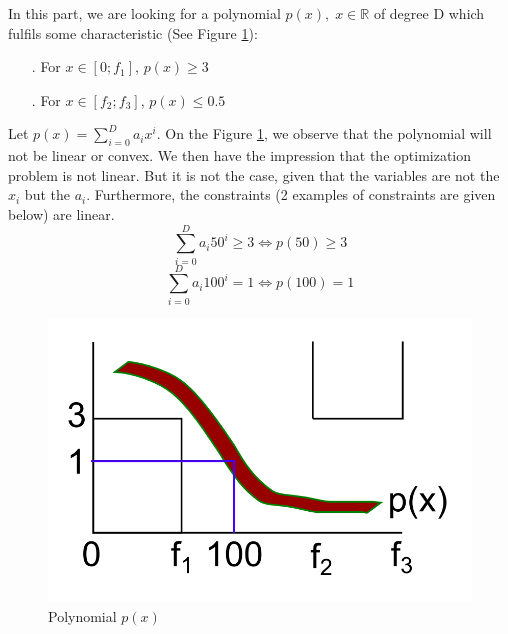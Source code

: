 In this part, we are looking for a polynomial $p(x), \; x \in \mathbb{R}$ of degree D which fulfils some characteristic (See Figure \ref{poly}): 
\begin{itemize}
\item[.]{For $x \in \left[0;f_1\right]$, $p(x) \geq 3$}
\item[.]{For $x \in \left[f_2;f_3\right]$, $p(x) \leq 0.5$} \\
\end{itemize}

Let $p(x) = \sum_{i=0}^{D} a_i x^{i}$.
On the Figure \ref{poly}, we observe that the polynomial will not be linear or convex. We then have the impression that the optimization problem is not linear. But it is not the case, given that the variables are not the $x_i$ but the $a_i$.
Furthermore, the constraints (2 examples of constraints are given below) are linear. 
$$ \sum_{i=0}^{D} a_i 50^{i} \geq 3 \Leftrightarrow p(50) \geq 3$$
$$ \sum_{i=0}^{D} a_i 100^{i} = 1 \Leftrightarrow p(100)=1$$

\begin{figure}[ht!]
\centering
\includegraphics[scale=0.4]{./images/Course3_poly.png}
\caption{Polynomial $p(x)$}
\label{poly}
\end{figure}

